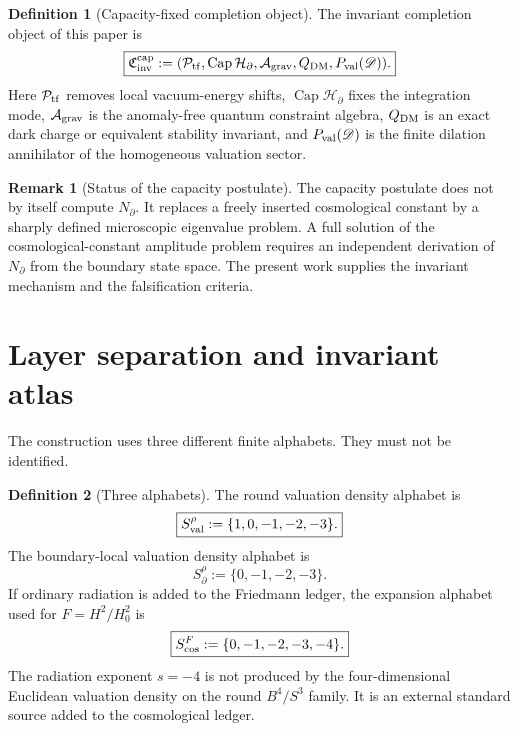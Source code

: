 \documentclass[aps,prd,reprint,nofootinbib,superscriptaddress]{revtex4-2}
\numberwithin{equation}{section}
\theoremstyle{definition}
\newtheorem{definition}{Definition}[section]
\newtheorem{remark}{Remark}[section]
\theoremstyle{plain}
\newcommand{\Dil}{\mathscr D}
\newcommand{\Agrav}{\mathcal A_{\rm grav}}
\newcommand{\Cinv}{\mathfrak C_{\rm inv}}
\newcommand{\Ncap}{N_{\partial}}
\newcommand{\Capacity}{\operatorname{Cap}}
\newcommand{\Ptr}{\mathcal P_{\rm tf}}
\begin{document}
\begin{definition}[Capacity-fixed completion object]
The invariant completion object of this paper is
\begin{equation}
\boxed{
\Cinv^{\rm cap}
:=
(\Ptr,\Capacity\mathcal H_\partial,\Agrav,Q_{\rm DM},P_{\rm val}(\Dil)).
}
\end{equation}
Here \(\Ptr\) removes local vacuum-energy shifts, \(\Capacity\mathcal H_\partial\) fixes the integration mode, \(\Agrav\) is the anomaly-free quantum constraint algebra, \(Q_{\rm DM}\) is an exact dark charge or equivalent stability invariant, and \(P_{\rm val}(\Dil)\) is the finite dilation annihilator of the homogeneous valuation sector.
\end{definition}



\begin{remark}[Status of the capacity postulate]
The capacity postulate does not by itself compute \(\Ncap\).  It replaces a freely inserted cosmological constant by a sharply defined microscopic eigenvalue problem.  A full solution of the cosmological-constant amplitude problem requires an independent derivation of \(\Ncap\) from the boundary state space.  The present work supplies the invariant mechanism and the falsification criteria.
\end{remark}

\section{Layer separation and invariant atlas}\label{sec:atlas}

The construction uses three different finite alphabets.  They must not be identified.

\begin{definition}[Three alphabets]
The round valuation density alphabet is
\begin{equation}
\boxed{
S_{\rm val}^{\rho}:=\{1,0,-1,-2,-3\}.
}
\end{equation}
The boundary-local valuation density alphabet is
\begin{equation}
\boxed{
S_{\partial}^{\rho}:=\{0,-1,-2,-3\}.
}
\end{equation}
If ordinary radiation is added to the Friedmann ledger, the expansion alphabet used for \(F=H^2/H_0^2\) is
\begin{equation}
\boxed{
S_{\rm cos}^{F}:=\{0,-1,-2,-3,-4\}.
}
\end{equation}
The radiation exponent \(s=-4\) is not produced by the four-dimensional Euclidean valuation density on the round \(B^4/S^3\) family.  It is an external standard source added to the cosmological ledger.
\end{definition}
\end{document}
